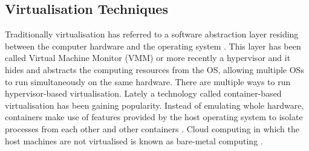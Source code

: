 \subsection{Virtualisation Techniques}

Traditionally virtualisation has referred to a software abstraction layer residing between the computer hardware and the operating system \cite{taxonomy}. This layer has been called Virtual Machine Monitor (VMM) or more recently a hypervisor and it hides and abstracts the computing resources from the OS, allowing multiple OSs to run simultaneously on the same hardware. There are multiple ways to run hypervisor-based virtualisation. Lately a technology called container-based virtualisation has been gaining popularity. Instead of emulating whole hardware, containers make use of features provided by the host operating system to isolate processes from each other and other containers \cite{eder2016hypervisor}. Cloud computing in which the host machines are not virtualised is known as bare-metal computing \cite{virtualisation_overhead}.

